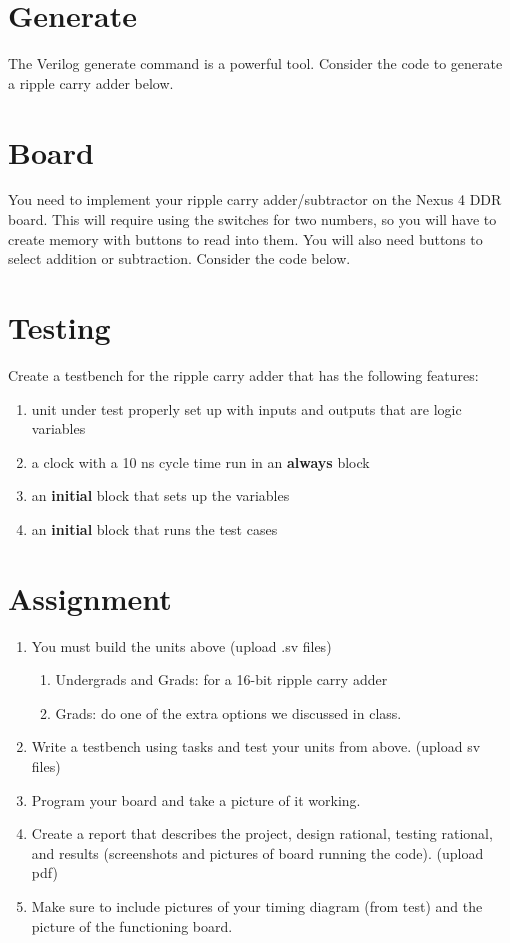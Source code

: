 \section{Generate}

The Verilog generate command is a powerful tool.  Consider the code to generate a ripple carry adder below.

\section{Board}

You need to implement your ripple carry adder/subtractor on the Nexus 4 DDR board.  This will require using the switches for two numbers, so you will have to create memory with buttons to read into them.  You will also need buttons to select addition or subtraction.  Consider the code below.


\section{Testing}
Create a testbench for the ripple carry adder that has the following features:
\begin{enumerate}
  \item unit under test properly set up with inputs and outputs that are logic variables
  \item a clock with a 10 ns cycle time run in an \textbf{always} block
  \item an \textbf{initial} block that sets up the variables
  \item an \textbf{initial} block that runs the test cases
\end{enumerate}

\section{Assignment}


\begin{enumerate}
\item You must build the units above (upload .sv files)
   \begin{enumerate}
   \item Undergrads and Grads: for a 16-bit ripple carry adder
   \item Grads: do one of the extra options we discussed in class.
   \end{enumerate}
\item Write a testbench using tasks and test your units from above. (upload sv files)
\item Program your board and take a picture of it working.
\item  Create a report that describes the project, design rational, testing rational, and results (screenshots and pictures of board running the code). (upload pdf)
\item Make sure to include pictures of your timing diagram (from test) and the picture of the functioning board.
\end{enumerate}